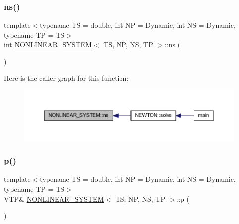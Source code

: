 \mbox{\label{class_n_o_n_l_i_n_e_a_r___s_y_s_t_e_m_abf4102c649f8316e44033a76f9d6183f}} 
\subsubsection{\texorpdfstring{ns()}{ns()}}
{\footnotesize\ttfamily template$<$typename TS = double, int NP = Dynamic, int NS = Dynamic, typename TP = TS$>$ \\
int \mbox{\hyperlink{class_n_o_n_l_i_n_e_a_r___s_y_s_t_e_m}{N\+O\+N\+L\+I\+N\+E\+A\+R\+\_\+\+S\+Y\+S\+T\+EM}}$<$ TS, NP, NS, TP $>$\+::ns (\begin{DoxyParamCaption}{ }\end{DoxyParamCaption})\hspace{0.3cm}{\ttfamily [inline]}}

Here is the caller graph for this function\+:\nopagebreak
\begin{figure}[H]
\begin{center}
\leavevmode
\includegraphics[width=350pt]{class_n_o_n_l_i_n_e_a_r___s_y_s_t_e_m_abf4102c649f8316e44033a76f9d6183f_icgraph}
\end{center}
\end{figure}
\mbox{\label{class_n_o_n_l_i_n_e_a_r___s_y_s_t_e_m_a1536a98a6cb3fec681bdd3312ae43714}} 
\subsubsection{\texorpdfstring{p()}{p()}\hspace{0.1cm}{\footnotesize\ttfamily [1/2]}}
{\footnotesize\ttfamily template$<$typename TS = double, int NP = Dynamic, int NS = Dynamic, typename TP = TS$>$ \\
V\+TP\& \mbox{\hyperlink{class_n_o_n_l_i_n_e_a_r___s_y_s_t_e_m}{N\+O\+N\+L\+I\+N\+E\+A\+R\+\_\+\+S\+Y\+S\+T\+EM}}$<$ TS, NP, NS, TP $>$\+::p (\begin{DoxyParamCaption}{ }\end{DoxyParamCaption})\hspace{0.3cm}{\ttfamily [inline]}}

